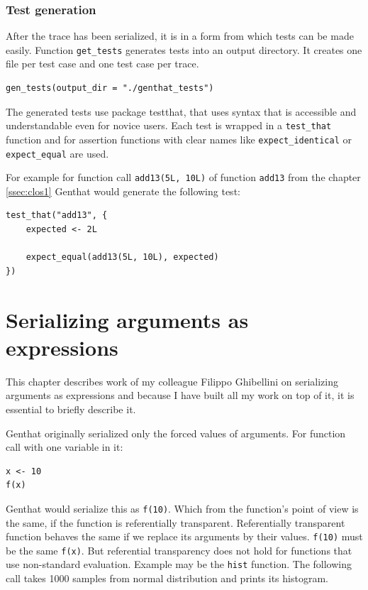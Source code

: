 \documentclass[thesis=B,english]{FITthesis}[2012/10/20]
\begin{document}
\subsection{Test generation}
After the trace has been serialized, it is in a form from which tests can be made easily. Function \verb|get_tests| generates tests into an output directory. It creates one file per test case and one test case per trace. 

\begin{verbatim}
gen_tests(output_dir = "./genthat_tests")
\end{verbatim}

The generated tests use package testthat, that uses syntax that is accessible and understandable even for novice users. Each test is wrapped in a \verb|test_that| function and for assertion functions with clear names like \verb|expect_identical| or \verb|expect_equal| are used.

For example for function call \verb|add13(5L, 10L)| of function \verb|add13| from the chapter \ref{ssec:clos1} Genthat would generate the following test:

\begin{verbatim}
test_that("add13", {
    expected <- 2L

    expect_equal(add13(5L, 10L), expected)
})
\end{verbatim}

\chapter{Serializing arguments as expressions}
This chapter describes work of my colleague Filippo Ghibellini on serializing arguments as expressions and because I have built all my work on top of it, it is essential to briefly describe it.

Genthat originally serialized only the forced values of arguments. For function call with one variable in it:

\begin{verbatim}
x <- 10
f(x)
\end{verbatim}

Genthat would serialize this as \verb|f(10)|. Which from the function’s point of view is the same, if the function is referentially transparent. Referentially transparent function behaves the same if we replace its arguments by their values. \verb|f(10)| must be the same \verb|f(x)|. But referential transparency does not hold for functions that use non-standard evaluation. Example may be the \verb|hist| function. The following call takes 1000 samples from normal distribution and prints its histogram.
\end{document}
